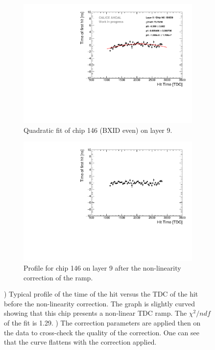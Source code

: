 \begin{figure}[htbp!]
	\begin{subfigure}[t]{0.5\textwidth}
		\centering
		\includegraphics[width=1\textwidth]{../Thesis_Plots/Timing/Muons/Plots/LinearityCorrection_Module09_Chip146_BXID0.pdf}
		\caption{Quadratic fit of chip 146 (BXID even) on layer 9.}\label{fig:LinCorr}
	\end{subfigure}
	\hfill
	\begin{subfigure}[t]{0.5\textwidth}
		\centering
		\includegraphics[width=1\textwidth]{../Thesis_Plots/Timing/Muons/Plots/LinearityCorrection_Module09_Chip146_BXID0_Corrected.pdf}
		\caption{Profile for chip 146 on layer 9 after the non-linearity correction of the ramp.}\label{fig:LinCorr_2}
	\end{subfigure}
	\caption{) Typical profile of the time of the hit versus the TDC of the hit before the non-linearity correction. The graph is slightly curved showing that this chip presents a non-linear TDC ramp. The $\chi^2/ndf$ of the fit is 1.29. ) The correction parameters are applied then on the data to cross-check the quality of the correction. One can see that the curve flattens with the correction applied.}
\end{figure}


